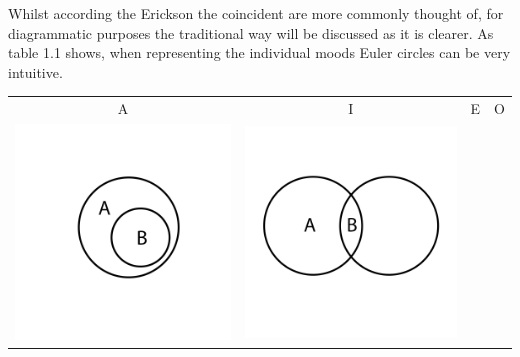 \documentclass[12pt,a4paper]{report}
\begin{document}
Whilst according the Erickson the coincident are more commonly thought of, for diagrammatic purposes the traditional way will be discussed as it is clearer. As table 1.1 shows, when representing the individual moods Euler circles can be very intuitive.

\begin{table}[h!]
  \centering
  \begin{tabular}{  c  c  c  c }
    A & I & E & O\\
    \begin{minipage}{.22\textwidth}
      \includegraphics[width=\linewidth]{AEuler}
    \end{minipage}
    &
    \begin{minipage}{.22\textwidth}
      \includegraphics[width=\linewidth]{IEuler}

\end{minipage}
\end{tabular}
\end{table}
\end{document}
